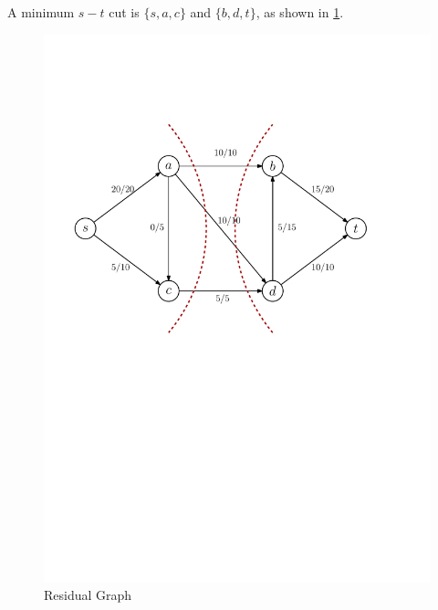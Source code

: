 \documentclass[12pt,letterpaper,titlepage,en-US]{article}
\begin{document}
\begin{homeworkProblem}
\begin{homeworkSubProblem}
\begin{homeworkSubProblem}
A minimum $s-t$ cut is $\{s,a,c\}$ and $\{b,d,t\}$, as shown in \cref{p3c}.
\begin{figure}[H]
    \caption{Residual Graph}\label{p3c}
    \centering
    \includegraphics[width=.6\textwidth]{p3c}
\end{figure}
\end{homeworkSubProblem}
\end{homeworkSubProblem}
\end{homeworkProblem}
\end{document}
